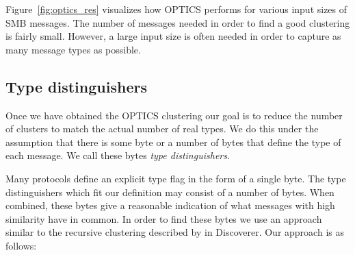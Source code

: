 \documentclass[a4paper]{report}
\begin{document}
Figure~\ref{fig:optics_res} visualizes how OPTICS performs for various input
sizes of SMB messages. The number of messages needed in order to find a good
clustering is fairly small. However, a large input size is often needed in
order to capture as many message types as possible.

\subsection{Type distinguishers}
Once we have obtained the OPTICS clustering our goal is to reduce the number of
clusters to match the actual number of real types. We do this under the
assumption that there is some byte or a number of bytes that define the type of
each message. We call these bytes \emph{type distinguishers}.

Many protocols define an explicit type flag in the form of a single byte. The
type distinguishers which fit our definition may consist of a number of bytes.
When combined, these bytes give a reasonable indication of what messages with
high similarity have in common. In order to find these bytes we use an approach
similar to the recursive clustering described by \citeauthor{cui07} in
Discoverer. Our approach is as follows:
\end{document}
